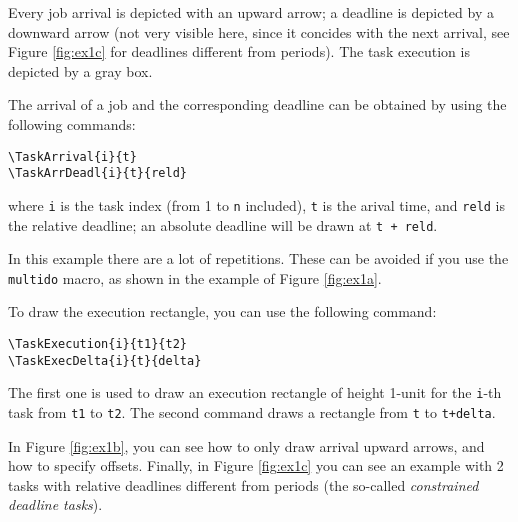 \documentclass{article}
\begin{document}
Every job arrival is depicted with an upward arrow; a deadline is
depicted by a downward arrow (not very visible here, since it concides
with the next arrival, see Figure \ref{fig:ex1c} for deadlines
different from periods). The task execution is depicted by a gray box.

The arrival of a job and the corresponding deadline can be obtained by
using the following commands:
\begin{verbatim}
\TaskArrival{i}{t}
\TaskArrDeadl{i}{t}{reld}
\end{verbatim}
\noindent where \texttt{i} is the task index (from 1 to \texttt{n}
included), \texttt{t} is the arival time, and \texttt{reld} is the
relative deadline; an absolute deadline will be drawn at \texttt{t +
  reld}.

In this example there are a lot of repetitions. These can be avoided
if you use the \texttt{multido} macro, as shown in the example of
Figure \ref{fig:ex1a}.

To draw the execution rectangle, you can use the following command:
\begin{verbatim}
\TaskExecution{i}{t1}{t2}
\TaskExecDelta{i}{t}{delta}
\end{verbatim}
The first one is used to draw an execution rectangle of height 1-unit
for the \texttt{i}-th task from \texttt{t1} to \texttt{t2}. The second
command draws a rectangle from \texttt{t} to \texttt{t+delta}.

In Figure \ref{fig:ex1b}, you can see how to only draw arrival upward
arrows, and how to specify offsets. Finally, in Figure \ref{fig:ex1c}
you can see an example with 2 tasks with relative deadlines different
from periods (the so-called \emph{constrained deadline tasks}).
\end{document}
